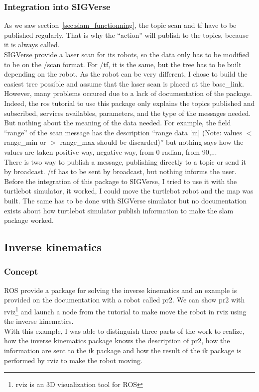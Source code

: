 \subsubsection{Integration into SIGVerse}
As we saw section~\ref{sec:slam_functionning}, the topic scan and tf have to be published regularly. That is why the ``action'' will publish to the topics, because it is always called.\\
SIGVerse provide a laser scan for its robots, so the data only has to be modified to be on the /scan format.
For /tf, it is the same, but the tree has to be built depending on the robot. As the robot can be very different, I chose to build the easiest tree possible and assume that the laser scan is placed at the base\_link.\\

However, many problems occured due to a lack of documentation of the package. Indeed, the ros tutorial to use this package only explains the topics published and subscribed, services availables, parameters, and the type of the messages needed. But nothing about the meaning of the data needed. For example, the field ``range'' of the scan message has the description ``range data [m] (Note: values $<$ range\_min or $>$ range\_max should be discarded)'' but nothing says how the values are taken positive way, negative way, from 0 radian, from 90,...\\

There is two way to publish a message, publishing directly to a topic or send it by broadcast. /tf has to be sent by broadcast, but nothing informs the user.\\

Before the integration of this package to SIGVerse, I tried to use it with the turtlebot simulator, it worked, I could move the turtlebot robot and the map was built. The same has to be done with SIGVerse simulator but no documentation exists about how turtlebot simulator publish information to make the slam package worked.

\subsection{Inverse kinematics}
\subsubsection{Concept}
ROS provide a package for solving the inverse kinematics and an example is provided on the documentation with a robot called pr2. We can show pr2 with rviz\footnote{rviz is an 3D visualization tool for ROS} and launch a node from the tutorial to make move the robot in rviz using the inverse kinematics.\\
With this example, I was able to distinguish three parts of the work to realize, how the inverse kinematics package knows the description of pr2, how the information are sent to the ik package and how the result of the ik package is performed by rviz to make the robot moving. 

